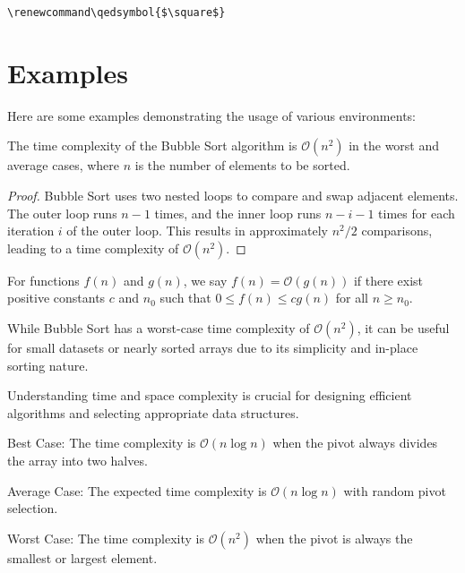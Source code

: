 \documentclass{ltxdoc}
\begin{document}
\begin{verbatim}
\renewcommand\qedsymbol{$\square$}
\end{verbatim}

\section{Examples}

Here are some examples demonstrating the usage of various environments:

\begin{theorem}
	The time complexity of the Bubble Sort algorithm is $\mathcal{O}(n^2)$ in the worst and average cases, where $n$ is the number of elements to be sorted.
\end{theorem}

\begin{proof}
	Bubble Sort uses two nested loops to compare and swap adjacent elements. The outer loop runs $n-1$ times, and the inner loop runs $n-i-1$ times for each iteration $i$ of the outer loop. This results in approximately $n^2/2$ comparisons, leading to a time complexity of $\mathcal{O}(n^2)$.
\end{proof}

\begin{definition}
	For functions $f(n)$ and $g(n)$, we say $f(n) = \mathcal{O}(g(n))$ if there exist positive constants $c$ and $n_0$ such that $0 \leq f(n) \leq cg(n)$ for all $n \geq n_0$.
\end{definition}

\begin{remark}
	While Bubble Sort has a worst-case time complexity of $\mathcal{O}(n^2)$, it can be useful for small datasets or nearly sorted arrays due to its simplicity and in-place sorting nature.
\end{remark}

\begin{important}
	Understanding time and space complexity is crucial for designing efficient algorithms and selecting appropriate data structures.
\end{important}

\begin{case}
	\item Best Case: The time complexity is $\mathcal{O}(n \log n)$ when the pivot always divides the array into two halves.
	\item Average Case: The expected time complexity is $\mathcal{O}(n \log n)$ with random pivot selection.
	\item Worst Case: The time complexity is $\mathcal{O}(n^2)$ when the pivot is always the smallest or largest element.
\end{case}
\end{document}
